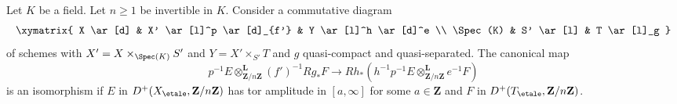 %
\begin{lemma}
\label{lemma-punctual-base-change-upgrade}
Let $K$ be a field. Let $n \geq 1$ be invertible in $K$.
Consider a commutative diagram
$$
\xymatrix{
X \ar[d] & X' \ar[l]^p \ar[d]_{f'} & Y \ar[l]^h \ar[d]^e \\
\Spec(K) & S' \ar[l] & T \ar[l]_g
}
$$
of schemes with
$X' = X \times_{\Spec(K)} S'$ and $Y = X' \times_{S'} T$ and
$g$ quasi-compact and quasi-separated. The canonical map
$$
p^{-1}E \otimes_{\mathbf{Z}/n\mathbf{Z}}^\mathbf{L} (f')^{-1}Rg_*F
\longrightarrow
Rh_*(h^{-1}p^{-1}E \otimes_{\mathbf{Z}/n\mathbf{Z}}^\mathbf{L} e^{-1}F)
$$
is an isomorphism if $E$ in $D^+(X_\etale, \mathbf{Z}/n\mathbf{Z})$
has tor amplitude in $[a, \infty]$ for some $a \in \mathbf{Z}$ and
$F$ in $D^+(T_\etale, \mathbf{Z}/n\mathbf{Z})$.
\end{lemma}


